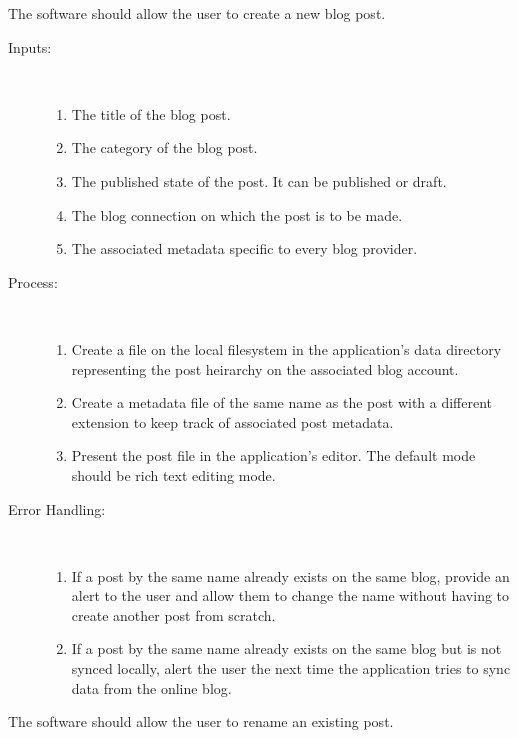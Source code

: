 
The software should allow the user to create a new blog post.

\begin{description}
    \item [Inputs:] ~
    \begin{enumerate}[noitemsep]
        \item {The title of the blog post.}
        \item {The category of the blog post.}
        \item {The published state of the post. It can be published or draft.}
        \item {The blog connection on which the post is to be made.}
        \item {The associated metadata specific to every blog provider.}
    \end{enumerate}
    \item [Process:] ~
    \begin{enumerate}[noitemsep]
        \item {Create a file on the local filesystem in the application's data directory representing the post heirarchy
               on the associated blog account.}
        \item {Create a metadata file of the same name as the post with a different extension to keep track of
               associated post metadata.}
        \item {Present the post file in the application's editor. The default mode should be rich text editing mode.}
    \end{enumerate}
    \item [Error Handling:] ~
        \begin{enumerate}[noitemsep]
        \item {If a post by the same name already exists on the same blog, provide an alert to the user and allow them
               to change the name without having to create another post from scratch.}
        \item {If a post by the same name already exists on the same blog but is not synced locally, alert the user the
               next time the application tries to sync data from the online blog.}
    \end{enumerate}
\end{description}


The software should allow the user to rename an existing post.

